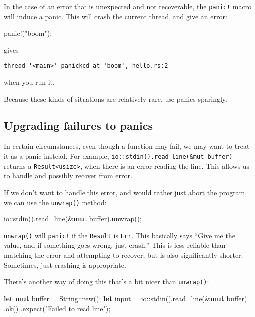 \documentclass[a4paper,]{book}
\newenvironment{Shaded}{\begin{snugshade}}{\end{snugshade}}
\newcommand{\KeywordTok}[1]{\textcolor[rgb]{0.13,0.29,0.53}{\textbf{{#1}}}}
\newcommand{\StringTok}[1]{\textcolor[rgb]{0.31,0.60,0.02}{{#1}}}
\newcommand{\OtherTok}[1]{\textcolor[rgb]{0.56,0.35,0.01}{{#1}}}
\newcommand{\NormalTok}[1]{{#1}}
\begin{document}
In the case of an error that is unexpected and not recoverable, the
\texttt{panic!} macro will induce a panic. This will crash the current
thread, and give an error:

\begin{Shaded}
\begin{Highlighting}[]
\OtherTok{panic!}\NormalTok{(}\StringTok{"boom"}\NormalTok{);}
\end{Highlighting}
\end{Shaded}

gives

\begin{verbatim}
thread '<main>' panicked at 'boom', hello.rs:2
\end{verbatim}

when you run it.

Because these kinds of situations are relatively rare, use panics
sparingly.

\subsection{Upgrading failures to
panics}\label{upgrading-failures-to-panics}

In certain circumstances, even though a function may fail, we may want
to treat it as a panic instead. For example,
\texttt{io::stdin().read\_line(\&mut\ buffer)} returns a
\texttt{Result\textless{}usize\textgreater{}}, when there is an error
reading the line. This allows us to handle and possibly recover from
error.

If we don't want to handle this error, and would rather just abort the
program, we can use the \texttt{unwrap()} method:

\begin{Shaded}
\begin{Highlighting}[]
\NormalTok{io::stdin().read_line(&}\KeywordTok{mut} \NormalTok{buffer).unwrap();}
\end{Highlighting}
\end{Shaded}

\texttt{unwrap()} will \texttt{panic!} if the \texttt{Result} is
\texttt{Err}. This basically says ``Give me the value, and if something
goes wrong, just crash.'' This is less reliable than matching the error
and attempting to recover, but is also significantly shorter. Sometimes,
just crashing is appropriate.

There's another way of doing this that's a bit nicer than
\texttt{unwrap()}:

\begin{Shaded}
\begin{Highlighting}[]
\KeywordTok{let} \KeywordTok{mut} \NormalTok{buffer = String::new();}
\KeywordTok{let} \NormalTok{input = io::stdin().read_line(&}\KeywordTok{mut} \NormalTok{buffer)}
                       \NormalTok{.ok()}
                       \NormalTok{.expect(}\StringTok{"Failed to read line"}\NormalTok{);}
\end{Highlighting}
\end{Shaded}
\end{document}
